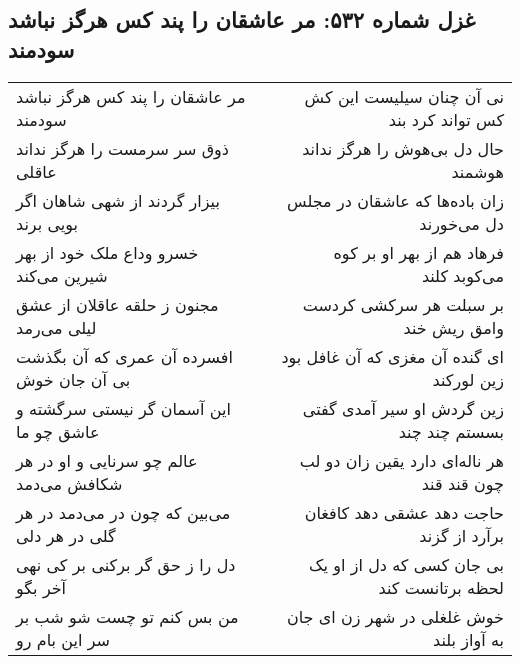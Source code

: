 \begin{center}
\section*{غزل شماره ۵۳۲: مر عاشقان را پند کس هرگز نباشد سودمند}
\label{sec:0532}
\begin{longtable}{l p{0.5cm} r}
مر عاشقان را پند کس هرگز نباشد سودمند
&&
نی آن چنان سیلیست این کش کس تواند کرد بند
\\
ذوق سر سرمست را هرگز نداند عاقلی
&&
حال دل بی‌هوش را هرگز نداند هوشمند
\\
بیزار گردند از شهی شاهان اگر بویی برند
&&
زان باده‌ها که عاشقان در مجلس دل می‌خورند
\\
خسرو وداع ملک خود از بهر شیرین می‌کند
&&
فرهاد هم از بهر او بر کوه می‌کوبد کلند
\\
مجنون ز حلقه عاقلان از عشق لیلی می‌رمد
&&
بر سبلت هر سرکشی کردست وامق ریش خند
\\
افسرده آن عمری که آن بگذشت بی آن جان خوش
&&
ای گنده آن مغزی که آن غافل بود زین لورکند
\\
این آسمان گر نیستی سرگشته و عاشق چو ما
&&
زین گردش او سیر آمدی گفتی بسستم چند چند
\\
عالم چو سرنایی و او در هر شکافش می‌دمد
&&
هر ناله‌ای دارد یقین زان دو لب چون قند قند
\\
می‌بین که چون در می‌دمد در هر گلی در هر دلی
&&
حاجت دهد عشقی دهد کافغان برآرد از گزند
\\
دل را ز حق گر برکنی بر کی نهی آخر بگو
&&
بی جان کسی که دل از او یک لحظه برتانست کند
\\
من بس کنم تو چست شو شب بر سر این بام رو
&&
خوش غلغلی در شهر زن ای جان به آواز بلند
\\
\end{longtable}
\end{center}
